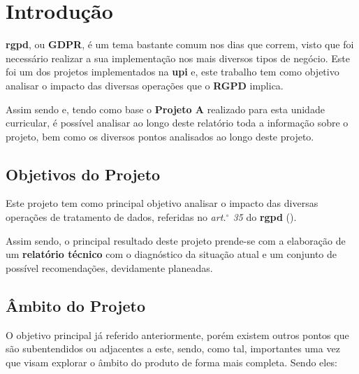 \section{Introdução}

\textbf{\acrshort{rgpd}}, ou \textbf{GDPR}, é um tema bastante comum nos dias que correm, visto que foi necessário realizar a sua implementação nos mais diversos tipos de negócio. Este foi um dos projetos implementados na \textbf{\acrshort{upi}} e, este trabalho tem como objetivo analisar o impacto das diversas operações que o \textbf{RGPD} implica.

Assim sendo e, tendo como base o \textbf{Projeto A} realizado para esta unidade curricular,  é possível analisar ao longo deste relatório toda a informação sobre o projeto, bem como os diversos pontos analisados ao longo deste projeto.

\subsection{Objetivos do Projeto}

Este projeto tem como principal objetivo analisar o impacto das diversas operações de tratamento de dados, referidas no \textit{art.$^\circ$ 35} do \textbf{\acrshort{rgpd}} ().

Assim sendo, o principal resultado deste projeto prende-se com a elaboração de um \textbf{relatório técnico} com o diagnóstico da situação atual e um conjunto de possível recomendações, devidamente planeadas.

\subsection{Âmbito do Projeto}

O objetivo principal já referido anteriormente, porém existem outros pontos que são subentendidos ou adjacentes a este, sendo, como tal, importantes uma vez que visam explorar o âmbito do produto de forma mais completa. Sendo eles:

